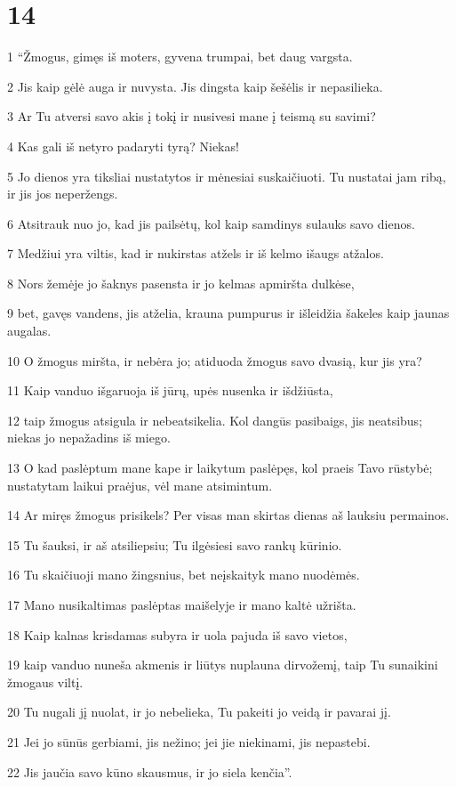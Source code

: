 \chapter{14}


\par 1 “Žmogus, gimęs iš moters, gyvena trumpai, bet daug vargsta. 
\par 2 Jis kaip gėlė auga ir nuvysta. Jis dingsta kaip šešėlis ir nepasilieka. 
\par 3 Ar Tu atversi savo akis į tokį ir nusivesi mane į teismą su savimi? 
\par 4 Kas gali iš netyro padaryti tyrą? Niekas! 
\par 5 Jo dienos yra tiksliai nustatytos ir mėnesiai suskaičiuoti. Tu nustatai jam ribą, ir jis jos neperžengs. 
\par 6 Atsitrauk nuo jo, kad jis pailsėtų, kol kaip samdinys sulauks savo dienos. 
\par 7 Medžiui yra viltis, kad ir nukirstas atžels ir iš kelmo išaugs atžalos. 
\par 8 Nors žemėje jo šaknys pasensta ir jo kelmas apmiršta dulkėse, 
\par 9 bet, gavęs vandens, jis atželia, krauna pumpurus ir išleidžia šakeles kaip jaunas augalas. 
\par 10 O žmogus miršta, ir nebėra jo; atiduoda žmogus savo dvasią, kur jis yra? 
\par 11 Kaip vanduo išgaruoja iš jūrų, upės nusenka ir išdžiūsta, 
\par 12 taip žmogus atsigula ir nebeatsikelia. Kol dangūs pasibaigs, jis neatsibus; niekas jo nepažadins iš miego. 
\par 13 O kad paslėptum mane kape ir laikytum paslėpęs, kol praeis Tavo rūstybė; nustatytam laikui praėjus, vėl mane atsimintum. 
\par 14 Ar miręs žmogus prisikels? Per visas man skirtas dienas aš lauksiu permainos. 
\par 15 Tu šauksi, ir aš atsiliepsiu; Tu ilgėsiesi savo rankų kūrinio. 
\par 16 Tu skaičiuoji mano žingsnius, bet neįskaityk mano nuodėmės. 
\par 17 Mano nusikaltimas paslėptas maišelyje ir mano kaltė užrišta. 
\par 18 Kaip kalnas krisdamas subyra ir uola pajuda iš savo vietos, 
\par 19 kaip vanduo nuneša akmenis ir liūtys nuplauna dirvožemį, taip Tu sunaikini žmogaus viltį. 
\par 20 Tu nugali jį nuolat, ir jo nebelieka, Tu pakeiti jo veidą ir pavarai jį. 
\par 21 Jei jo sūnūs gerbiami, jis nežino; jei jie niekinami, jis nepastebi. 
\par 22 Jis jaučia savo kūno skausmus, ir jo siela kenčia”.




